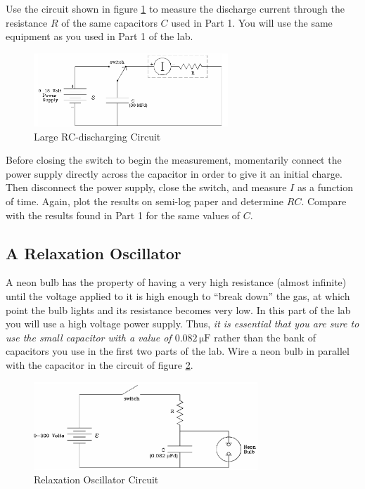 Use the circuit shown in figure \ref{fig:largercdischarge} to measure the discharge current through the resistance $R$ of the same capacitors $C$ used in Part 1. You will use the same equipment as you used in Part 1 of the lab. \myskip

\begin{figure}[h]
    \begin{center}
        \includegraphics[width=0.65\textwidth]{./Exp3/pic/image7.png}
    \end{center}
    \caption{Large RC-discharging Circuit}
    \label{fig:largercdischarge}
\end{figure}

Before closing the switch to begin the measurement, momentarily connect the power supply directly across the capacitor in order to give it an initial charge. Then disconnect the power supply, close the switch, and measure $I$ as a function of time. Again, plot the results on semi-log paper and determine $RC$. Compare with the results found in Part 1 for the same values of $C$.

\subsection{A Relaxation Oscillator}

A neon bulb has the property of having a very high resistance (almost infinite) until the voltage applied to it is high enough to ``break down'' the gas, at which point the bulb lights and its resistance becomes very low. In this part of the lab you will use a high voltage power supply. Thus, \emph{it is essential that you are sure to use the small capacitor with a value of $0.082\,\mathrm{\mu F}$} rather than the bank of capacitors you use in the first two parts of the lab. Wire a neon bulb in parallel with the capacitor in the circuit of figure \ref{fig:relaxcirc}.\myskip

\begin{figure}[h]
    \begin{center}
        \includegraphics[width=0.75\textwidth]{./Exp3/pic/image8.png}
    \end{center}
    \caption{Relaxation Oscillator Circuit}
    \label{fig:relaxcirc}
\end{figure}

